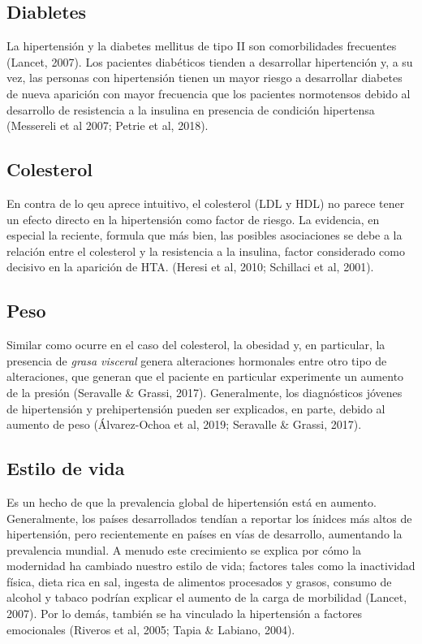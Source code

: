 \documentclass{aa}
\begin{document}
\subsection{Diabletes}

La hipertensión y la diabetes mellitus de tipo II son comorbilidades frecuentes (Lancet, 2007). Los pacientes diabéticos tienden a desarrollar hipertención y, a su vez, las personas con hipertensión tienen un mayor riesgo a desarrollar diabetes de nueva aparición con mayor frecuencia que los pacientes normotensos debido al desarrollo de resistencia a la insulina en presencia de condición hipertensa (Messereli et al 2007; Petrie et al, 2018).

\subsection{Colesterol}

En contra de lo qeu aprece intuitivo, el colesterol (LDL y HDL) no parece tener un efecto directo en la hipertensión como factor de riesgo. La evidencia, en especial la reciente, formula que más bien, las posibles asociaciones se debe a la relación entre el colesterol y la resistencia a la insulina, factor considerado como decisivo en la aparición de HTA. (Heresi et al, 2010; Schillaci et al, 2001).

\subsection{Peso}

Similar como ocurre en el caso del colesterol, la obesidad y, en particular, la presencia de \textit{grasa visceral} genera alteraciones hormonales entre otro tipo de alteraciones, que generan que el paciente en particular experimente un aumento de la presión (Seravalle \& Grassi, 2017). Generalmente, los diagnósticos jóvenes de hipertensión y prehipertensión pueden ser explicados, en parte, debido al aumento de peso (Álvarez-Ochoa et al, 2019; Seravalle \& Grassi, 2017).

\subsection{Estilo de vida}

Es un hecho de que la prevalencia global de hipertensión está en aumento. Generalmente, los países desarrollados tendían a reportar los ínidces más altos de hipertensión, pero recientemente en países en vías de desarrollo, aumentando la prevalencia mundial. A menudo este crecimiento se explica por cómo la modernidad ha cambiado nuestro estilo de vida; factores tales como la inactividad física, dieta rica en sal, ingesta de alimentos procesados y grasos, consumo de alcohol y tabaco podrían explicar el aumento de la carga de morbilidad (Lancet, 2007). Por lo demás, también se ha vinculado la hipertensión a factores emocionales (Riveros et al, 2005; Tapia \& Labiano, 2004).
\end{document}
